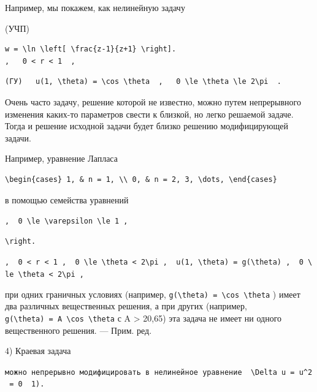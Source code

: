 \documentclass[
  ukrainian,
]{article}
\begin{document}
Например, мы покажем, как нелинейную задачу

(УЧП)

\begin{verbatim}
w = \ln \left[ \frac{z-1}{z+1} \right].
,   0 < r < 1  ,
\end{verbatim}

\begin{verbatim}
(ГУ)   u(1, \theta) = \cos \theta  ,   0 \le \theta \le 2\pi  .
\end{verbatim}

Очень часто задачу, решение которой не известно, можно путем
непрерывного изменения каких-то параметров свести к близкой, но легко
решаемой задаче. Тогда и решение исходной задачи будет близко решению
модифицирующей задачи.

Например, уравнение Лапласа

\begin{verbatim}
\begin{cases} 1, & n = 1, \\ 0, & n = 2, 3, \dots, \end{cases}
\end{verbatim}

в помощью семейства уравнений

\texttt{,\ \ \textquotesingle{}0\ \textbackslash{}le\ \textbackslash{}varepsilon\ \textbackslash{}le\ 1\textquotesingle{}\ ,}

\begin{verbatim}
\right.
\end{verbatim}

\texttt{,\ \ \textquotesingle{}0\ \textless{}\ r\ \textless{}\ 1\textquotesingle{}\ ,\ \ \textquotesingle{}0\ \textbackslash{}le\ \textbackslash{}theta\ \textless{}\ 2\textbackslash{}pi\textquotesingle{}\ ,\ \ \textquotesingle{}u(1,\ \textbackslash{}theta)\ =\ g(\textbackslash{}theta)\textquotesingle{}\ ,\ \ \textquotesingle{}0\ \textbackslash{}le\ \textbackslash{}theta\ \textless{}\ 2\textbackslash{}pi\textquotesingle{}\ ,}

при одних граничных условиях (например,
\texttt{g(\textbackslash{}theta)\ =\ \textbackslash{}cos\ \textbackslash{}theta}
) имеет два различных вещественных решения, а при других (например,
\texttt{g(\textbackslash{}theta)\ =\ A\ \textbackslash{}cos\ \textbackslash{}theta}
с A \textgreater{} 20,65) эта задача не имеет ни одного вещественного
решения. --- Прим. ред.

4) Краевая задача

\texttt{можно\ непрерывно\ модифицировать\ в\ нелинейное\ уравнение\ \ \textquotesingle{}\textbackslash{}Delta\ u\ =\ u\^{}2\ =\ 0\textquotesingle{}\ \ 1).}
\end{document}

